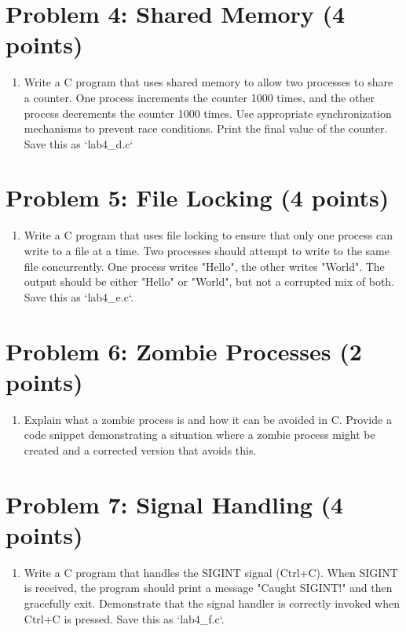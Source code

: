\documentclass{article}
\begin{document}
\section{Problem 4:  Shared Memory (4 points)}

\begin{enumerate}
    \item Write a C program that uses shared memory to allow two processes to share a counter. One process increments the counter 1000 times, and the other process decrements the counter 1000 times.  Use appropriate synchronization mechanisms to prevent race conditions.  Print the final value of the counter.  Save this as `lab4_d.c`
\end{enumerate}

\section{Problem 5:  File Locking (4 points)}

\begin{enumerate}
    \item Write a C program that uses file locking to ensure that only one process can write to a file at a time.  Two processes should attempt to write to the same file concurrently. One process writes "Hello", the other writes "World".  The output should be either "Hello" or "World", but not a corrupted mix of both.  Save this as `lab4_e.c`.
\end{enumerate}

\section{Problem 6:  Zombie Processes (2 points)}

\begin{enumerate}
    \item Explain what a zombie process is and how it can be avoided in C. Provide a code snippet demonstrating a situation where a zombie process might be created and a corrected version that avoids this.
\end{enumerate}

\section{Problem 7:  Signal Handling (4 points)}

\begin{enumerate}
    \item Write a C program that handles the SIGINT signal (Ctrl+C). When SIGINT is received, the program should print a message "Caught SIGINT!" and then gracefully exit.  Demonstrate that the signal handler is correctly invoked when Ctrl+C is pressed. Save this as `lab4_f.c`.
\end{enumerate}
\end{document}
